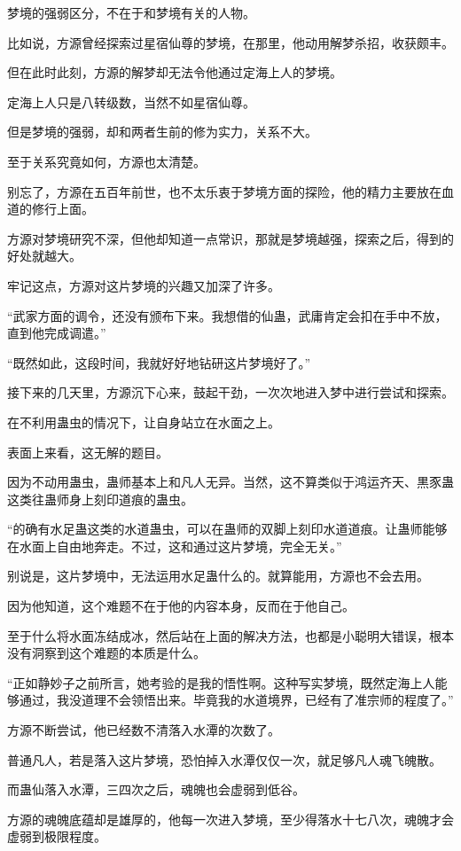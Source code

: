 \begin{this_body}
梦境的强弱区分，不在于和梦境有关的人物。

比如说，方源曾经探索过星宿仙尊的梦境，在那里，他动用解梦杀招，收获颇丰。

但在此时此刻，方源的解梦却无法令他通过定海上人的梦境。

定海上人只是八转级数，当然不如星宿仙尊。

但是梦境的强弱，却和两者生前的修为实力，关系不大。

至于关系究竟如何，方源也太清楚。

别忘了，方源在五百年前世，也不太乐衷于梦境方面的探险，他的精力主要放在血道的修行上面。

方源对梦境研究不深，但他却知道一点常识，那就是梦境越强，探索之后，得到的好处就越大。

牢记这点，方源对这片梦境的兴趣又加深了许多。

“武家方面的调令，还没有颁布下来。我想借的仙蛊，武庸肯定会扣在手中不放，直到他完成调遣。”

“既然如此，这段时间，我就好好地钻研这片梦境好了。”

接下来的几天里，方源沉下心来，鼓起干劲，一次次地进入梦中进行尝试和探索。

在不利用蛊虫的情况下，让自身站立在水面之上。

表面上来看，这无解的题目。

因为不动用蛊虫，蛊师基本上和凡人无异。当然，这不算类似于鸿运齐天、黒豕蛊这类往蛊师身上刻印道痕的蛊虫。

“的确有水足蛊这类的水道蛊虫，可以在蛊师的双脚上刻印水道道痕。让蛊师能够在水面上自由地奔走。不过，这和通过这片梦境，完全无关。”

别说是，这片梦境中，无法运用水足蛊什么的。就算能用，方源也不会去用。

因为他知道，这个难题不在于他的内容本身，反而在于他自己。

至于什么将水面冻结成冰，然后站在上面的解决方法，也都是小聪明大错误，根本没有洞察到这个难题的本质是什么。

“正如静妙子之前所言，她考验的是我的悟性啊。这种写实梦境，既然定海上人能够通过，我没道理不会领悟出来。毕竟我的水道境界，已经有了准宗师的程度了。”

方源不断尝试，他已经数不清落入水潭的次数了。

普通凡人，若是落入这片梦境，恐怕掉入水潭仅仅一次，就足够凡人魂飞魄散。

而蛊仙落入水潭，三四次之后，魂魄也会虚弱到低谷。

方源的魂魄底蕴却是雄厚的，他每一次进入梦境，至少得落水十七八次，魂魄才会虚弱到极限程度。


\end{this_body}
